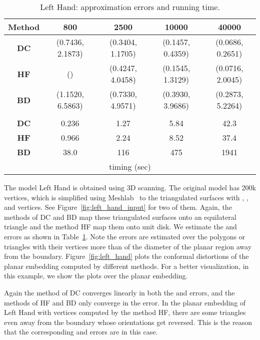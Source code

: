 \documentclass[11pt]{article}
\begin{document}
\begin{table}[!h]
\begin{center}
\begin{tabular}{| c | c | c | c | c |}
\hline
Method  & 800 &  2500 & 10000 & 40000   \\
\hline
{\bf DC} & (0.7436, 2.1873) & (0.3404, 1.1705) & (0.1457, 0.4359) & (0.0686, 0.2651) \\ \hline
{\bf HF} & () & (0.4247, 4.0458) & (0.1545, 1.3129) & (0.0716, 2.0045)\\
\hline
{\bf BD}& (1.1520, 6.5863) & (0.7330, 4.9571) & (0.3930, 3.9686) & (0.2873, 5.2264)\\
\hline
\multicolumn{5}{|c|}{ } \\
\hline
{\bf DC} & 0.236 & 1.27 & 5.84 & 42.3 \\
\hline
{\bf HF} &  0.966 & 2.24& 8.52 & 37.4 \\
\hline
{\bf BD}& 38.0  &  116 & 475 & 1941\\
\hline
\multicolumn{5}{|c|}{ timing (sec)} \\
\hline
\end{tabular}
\end{center}
\vspace{-0.1in}
\caption{Left Hand: approximation errors and running time.
\label{tbl:left_hand}
}
\end{table}

\vspace{0.3in}
The model Left Hand is obtained using 3D scanning. The original model has 200k vertices, which 
is simplified using Meshlab~\cite{meshlab} to the triangulated surfaces with , 
,  and  vertices. See Figure~\ref{fig:left_hand_input} for two of them. 
Again, the methods of DC and BD map these triangulated surfaces onto an equilateral triangle 
and the method HF map them onto unit disk. We estimate the  and  errors as 
shown in Table~\ref{tbl:left_hand}. Note the errors are estimated over the 
polygons or triangles with their vertices more than  of the diameter
of the planar region away from the boundary. Figure~\ref{fig:left_hand} plots the conformal
distortions of the planar embedding computed by different methods. For a better visualization, 
in this example, we show the plots over the planar embedding. 

Again the method of DC converges linearly in both the  and  errors, and the methods 
of HF and BD only converge in the  error. In the planar embedding of Left Hand with  
vertices computed by the method HF, there are some triangles even away from the boundary whose orientations 
get reversed. This is the reason that the corresponding  and  errors are 
in this case.
\end{document}
